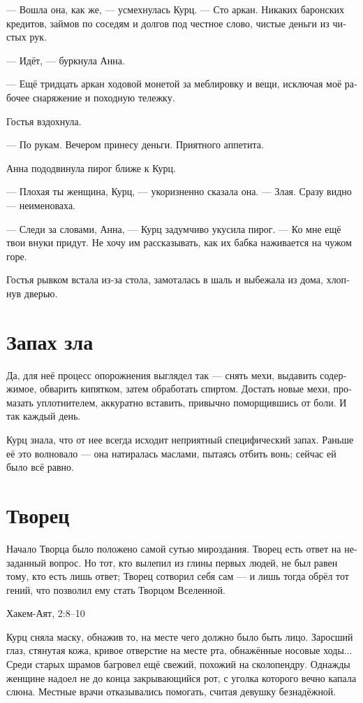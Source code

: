 \documentclass[a4paper,10pt,fleqn]{book}\usepackage{polyglossia}\setdefaultlanguage[babelshorthands=true]{russian}\setotherlanguage{english}\defaultfontfeatures{Ligatures=TeX,Mapping=tex-text}\usepackage{xcolor}\newcommand{\ml}[3]{#2}
\begin{document}
--- Вошла она, как же, --- усмехнулась Курц.
--- Сто аркан.
Никаких баронских кредитов, займов по соседям и долгов под честное слово, чистые деньги из чистых рук.

--- Идёт, --- буркнула Анна.

--- Ещё тридцать аркан ходовой монетой за меблировку и вещи, исключая моё рабочее снаряжение и походную тележку.

Гостья вздохнула.

--- По рукам.
Вечером принесу деньги.
Приятного аппетита.

Анна пододвинула пирог ближе к Курц.

--- Плохая ты женщина, Курц, --- укоризненно сказала она.
--- Злая.
Сразу видно --- неименоваха.

--- Следи за словами, Анна, --- Курц задумчиво укусила пирог.
--- Ко мне ещё твои внуки придут.
Не хочу им рассказывать, как их бабка наживается на чужом горе.

Гостья рывком встала из-за стола, замоталась в шаль и выбежала из дома, хлопнув дверью.

\section{Запах зла}

Да, для неё процесс опорожнения выглядел так --- снять мехи, выдавить содержимое, обварить кипятком, затем обработать спиртом.
Достать новые мехи, промазать уплотнителем, аккуратно вставить, привычно поморщившись от боли.
И так каждый день.

Курц знала, что от нее всегда исходит неприятный специфический запах.
Раньше её это волновало --- она натиралась маслами, пытаясь отбить вонь;
сейчас ей было всё равно.

\section{Творец}

\epigraph{Начало Творца было положено самой сутью мироздания.
Творец есть ответ на незаданный вопрос.
Но тот, кто вылепил из глины первых людей, не был равен тому, кто есть лишь ответ;
Творец сотворил себя сам --- и лишь тогда обрёл тот гений, что позволил ему стать Творцом Вселенной.}
{Хакем-Аят, 2:8--10}

Курц сняла маску, обнажив то, на месте чего должно было быть лицо.
Заросший глаз, стянутая кожа, кривое отверстие на месте рта, обнажённые носовые ходы...
Среди старых шрамов багровел ещё свежий, похожий на сколопендру.
Однажды женщине надоел не до конца закрывающийся рот, с уголка которого вечно капала слюна.
Местные врачи отказывались помогать, считая девушку безнадёжной.
\end{document}
